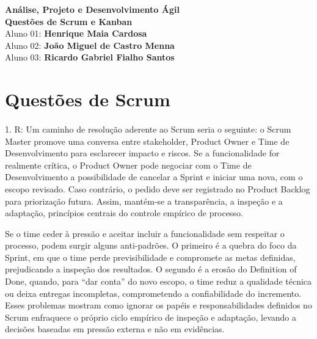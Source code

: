 \documentclass[12pt,a4paper]{article}
\begin{document}
\begin{center}
    \centering

    {\huge \textbf{Análise, Projeto e Desenvolvimento Ágil}}\\[0.5cm]

    {\Huge \textbf{Questões de Scrum e Kanban}}\\[0.5cm]

    {\large Aluno 01: \textbf{Henrique Maia Cardosa}}\\[0.5cm]
    {\large Aluno 02: \textbf{João Miguel de Castro Menna}}\\[0.5cm]
    {\large Aluno 03: \textbf{Ricardo Gabriel Fialho Santos}}\\[2.5cm]
\end{center}

\pagebreak

\section*{Questões de Scrum}

\paragraph{}

1. R: Um caminho de resolução aderente ao Scrum seria o seguinte: o Scrum Master
promove uma conversa entre stakeholder, Product Owner e Time de Desenvolvimento para
esclarecer impacto e riscos. Se a funcionalidade for realmente crítica, o Product Owner pode
negociar com o Time de Desenvolvimento a possibilidade de cancelar a Sprint e iniciar uma
nova, com o escopo revisado. Caso contrário, o pedido deve ser registrado no Product
Backlog para priorização futura. Assim, mantém-se a transparência, a inspeção e a
adaptação, princípios centrais do controle empírico de processo.

Se o time ceder à pressão e aceitar incluir a funcionalidade sem respeitar o
processo, podem surgir alguns anti-padrões. O primeiro é a quebra do foco da Sprint, em
que o time perde previsibilidade e compromete as metas definidas, prejudicando a inspeção
dos resultados. O segundo é a erosão do Definition of Done, quando, para “dar conta” do
novo escopo, o time reduz a qualidade técnica ou deixa entregas incompletas,
comprometendo a confiabilidade do incremento. Esses problemas mostram como ignorar os
papéis e responsabilidades definidos no Scrum enfraquece o próprio ciclo empírico de
inspeção e adaptação, levando a decisões baseadas em pressão externa e não em
evidências.
\end{document}
